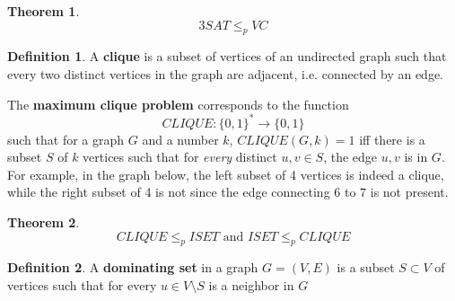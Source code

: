 \documentclass[a4paper, 12pt]{report}
\newtheorem{theorem}{Theorem}[section]
\theoremstyle{remark}
\theoremstyle{definition}
\newtheorem{definition}{Definition}[section]
\begin{document}
\begin{theorem}
\[3SAT \leq_p VC\]
\end{theorem}

\begin{definition}
A \textbf{clique} is a subset of vertices of an undirected graph such that every two distinct vertices in the graph are adjacent, i.e. connected by an edge. 

The \textbf{maximum clique problem} corresponds to the function 
\[CLIQUE: \{0,1\}^* \longrightarrow \{0,1\}\]
such that for a graph $G$ and a number $k$, $CLIQUE(G, k) = 1$ iff there is a subset $S$ of $k$ vertices such that for \textit{every} distinct $u, v \in S$, the edge $u, v$ is in $G$. For example, in the graph below, the left subset of 4 vertices is indeed a clique, while the right subset of 4 is not since the edge connecting $6$ to $7$ is not present. 
\begin{center}
\end{center}
\end{definition}

\begin{theorem}
\[CLIQUE \leq_p ISET \text{ and } ISET \leq_p CLIQUE\]
\end{theorem}

\begin{definition}
A \textbf{dominating set} in a graph $G = (V, E)$ is a subset $S \subset V$ of vertices such that for every $u \in V \setminus S$ is a neighbor in $G$ 
\end{definition}
\end{document}
